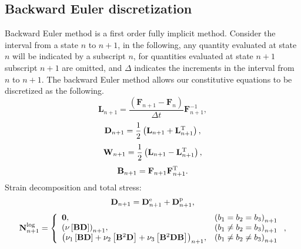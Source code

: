 \subsection{Backward Euler discretization}
\noindent
Backward Euler method is a first order fully implicit method. Consider the interval from a state $n$ to $n+1$, in the following, any quantity evaluated at state $n$ will be indicated by a subscript $n$, for quantities evaluated at state $n+1$ subscript $n+1$ are omitted, and $\Delta$ indicates the increments in the interval from $n$ to $n+1$. The backward Euler method allows our constitutive equations to be discretized as the following.
\begin{equation}
{{\mathbf{L}}_{n + 1}} = \frac{{\left( {{{\mathbf{F}}_{n + 1}} - {{\mathbf{F}}_n}} \right)}}{{\Delta t}}{\mathbf{F}}_{n + 1}^{ - 1},
\end{equation}
\begin{equation}
{{\mathbf{D}}_{n + 1}} = \frac{1}{2}\left( {{{\mathbf{L}}_{n + 1}} + {\mathbf{L}}_{n + 1}^{\rm{T}}} \right),
\end{equation}
\begin{equation}
{{\mathbf{W}}_{n + 1}} = \frac{1}{2}\left( {{{\mathbf{L}}_{n + 1}} - {\mathbf{L}}_{n + 1}^{\rm{T}}} \right),
\end{equation}
\begin{equation}
{{\mathbf{B}}_{n + 1}} = {{\mathbf{F}}_{n + 1}}{\mathbf{F}}_{n + 1}^{\rm{T}}.
\end{equation}
Strain decomposition and total stress:
\begin{equation}
{\mathbf{D}}_{n + 1} = {\mathbf{D}}^{\rm{e}}_{n + 1} + {\mathbf{D}}^{\rm{p}}_{n + 1},
\end{equation}
\begin{equation}
{\bf{N}}_{n + 1}^{\log } = \left\{ {\begin{array}{*{20}{l}}
{{\bf{0}},}&{{{\left( {{b_1} = {b_2} = {b_3}} \right)}_{n + 1}}}\\
{{{\left( {\nu \left[ {{\bf{BD}}} \right]} \right)}_{n + 1}},}&{{{\left( {{b_1} \ne {b_2} = {b_3}} \right)}_{n + 1}}}\\
{{{\left( {{\nu _1}\left[ {{\bf{BD}}} \right] + {\nu _2}\left[ {{{\bf{B}}^2}{\bf{D}}} \right] + {\nu _3}\left[ {{{\bf{B}}^2}{\bf{DB}}} \right]} \right)}_{n + 1}},}&{{{\left( {{b_1} \ne {b_2} \ne {b_3}} \right)}_{n + 1}}}
\end{array}} \right.
,
\end{equation}
